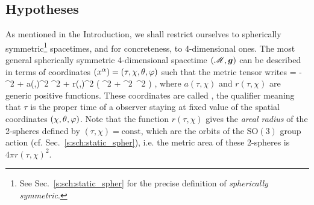\subsection{Hypotheses} \label{s:lem:hyp}

As mentioned in the Introduction, we shall restrict ourselves to
spherically symmetric\footnote{See Sec.~\ref{s:sch:static_spher} for the precise
definition of \emph{spherically symmetric}.} spacetimes, and for concreteness, to 4-dimensional ones. The most general spherically symmetric 4-dimensional spacetime $(\mathscr{M},\bm{g})$
can be described in terms of coordinates $(x^\alpha)=(\tau,\chi,\theta,\varphi)$ such that
the metric tensor writes
\be \label{e:lem:metric_sync_coord}
     = - \dd\tau^2 + a(\tau,\chi)^2 \dd\chi^2
        + r(\tau,\chi)^2 \left( \dd\th^2 + \sin^2\th\, \dd\ph^2 \right)  ,
\ee
where $a(\tau,\chi)$ and $r(\tau,\chi)$ are generic positive functions.
These coordinates are called , the qualifier
 meaning that $\tau$ is the proper time of a observer staying
at fixed value of the spatial coordinates $(\chi,\theta,\varphi)$.
Note that the function $r(\tau,\chi)$ gives the \emph{areal radius}
of the 2-spheres
defined by $(\tau,\chi) = \mathrm{const}$, which are the orbits of the $\mathrm{SO}(3)$
group action (cf. Sec.~\ref{s:sch:static_spher}), i.e. the metric area of these
2-spheres is $4\pi r(\tau,\chi)^2$.

